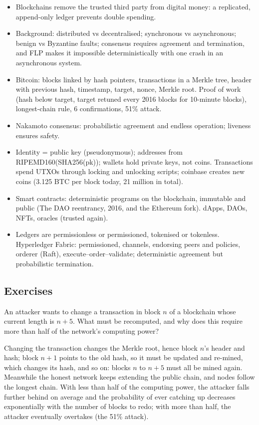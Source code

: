 \begin{summary}
\begin{itemize}
    \item Blockchains remove the trusted third party from digital money: a replicated, append-only ledger prevents double spending.
    \item Background: distributed vs decentralised; synchronous vs asynchronous; benign vs Byzantine faults; consensus requires agreement and termination, and FLP makes it impossible deterministically with one crash in an asynchronous system.
    \item Bitcoin: blocks linked by hash pointers, transactions in a Merkle tree, header with previous hash, timestamp, target, nonce, Merkle root. Proof of work (hash below target, target retuned every 2016 blocks for 10-minute blocks), longest-chain rule, 6 confirmations, 51\% attack.
    \item Nakamoto consensus: probabilistic agreement and endless operation; liveness ensures safety.
    \item Identity = public key (pseudonymous); addresses from RIPEMD160(SHA256(pk)); wallets hold private keys, not coins. Transactions spend UTXOs through locking and unlocking scripts; coinbase creates new coins (3.125 BTC per block today, 21 million in total).
    \item Smart contracts: deterministic programs on the blockchain, immutable and public (The DAO reentrancy, 2016, and the Ethereum fork). dApps, DAOs, NFTs, oracles (trusted again).
    \item Ledgers are permissionless or permissioned, tokenised or tokenless. Hyperledger Fabric: permissioned, channels, endorsing peers and policies, orderer (Raft), execute--order--validate; deterministic agreement but probabilistic termination.
\end{itemize}
\end{summary}

\subsection*{Exercises}

\begin{exercise}
An attacker wants to change a transaction in block $n$ of a blockchain whose current length is $n + 5$. What must be recomputed, and why does this require more than half of the network's computing power?
\end{exercise}
\begin{solution}
Changing the transaction changes the Merkle root, hence block $n$'s header and hash; block $n+1$ points to the old hash, so it must be updated and re-mined, which changes its hash, and so on: blocks $n$ to $n+5$ must all be mined again. Meanwhile the honest network keeps extending the public chain, and nodes follow the longest chain. With less than half of the computing power, the attacker falls further behind on average and the probability of ever catching up decreases exponentially with the number of blocks to redo; with more than half, the attacker eventually overtakes (the 51\% attack).
\end{solution}

